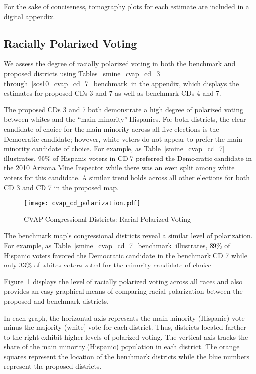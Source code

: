\documentclass[12pt]{scrartcl}
\begin{document}
For the sake of conciseness, tomography plots for each estimate are included in a digital appendix.

\subsection{Racially Polarized Voting}
We assess the degree of racially polarized voting in both the benchmark and proposed districts using Tables~\ref{smine_cvap_cd_3} through~\ref{sos10_cvap_cd_7_benchmark} in the appendix, which displays the estimates for proposed CDs 3 and 7 as well as benchmark CDs 4 and 7. 

The proposed CDs 3 and 7 both demonstrate a high degree of polarized voting between whites and the ``main minority'' Hispanics. For both districts, the clear candidate of choice for the main minority across all five elections is the Democratic candidate; however, white voters do not appear to prefer the main minority candidate of choice. For example, as Table~\ref{smine_cvap_cd_7} illustrates, 90\% of Hispanic voters in CD 7 preferred the Democratic candidate in the 2010 Arizona Mine Inspector while there was an even split among white voters for this candidate. A similar trend holds across all other elections for both CD 3 and CD 7 in the proposed map.

\begin{figure}[!h]
\begin{centering}
\texttt{[image: cvap\_cd\_polarization.pdf]}
\caption{CVAP Congressional Districts: Racial Polarized Voting}
\end{centering}
\label{cvap_cd_polarization}
\end{figure}

The benchmark map's congressional districts reveal a similar level of polarization. For example, as Table~\ref{smine_cvap_cd_7_benchmark} illustrates, 89\% of Hispanic voters favored the Democratic candidate in the benchmark CD 7 while only 33\% of whites voters voted for the minority candidate of choice.

Figure~\ref{cvap_cd_polarization} displays the level of racially polarized voting across all races and also provides an easy graphical means of comparing racial polarization between the proposed and benchmark districts.

In each graph, the horizontal axis represents the main minority (Hispanic) vote minus the majority (white) vote for each district. Thus, districts located farther to the right exhibit higher levels of polarized voting. The vertical axis tracks the share of the main minority (Hispanic) population in each district. The orange squares represent the location of the benchmark districts while the blue numbers represent the proposed districts.
\end{document}
